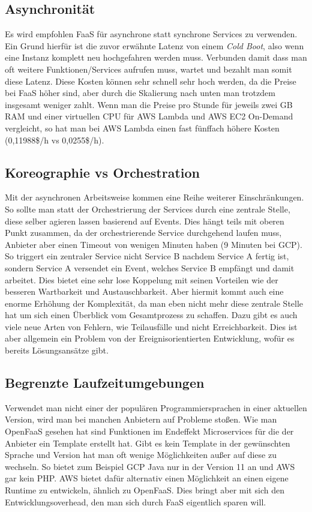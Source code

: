 \documentclass[12pt, a4paper]{article}
\begin{document}
\subsection{Asynchronität}
Es wird empfohlen \ac{FaaS} für asynchrone statt synchrone Services zu verwenden.
Ein Grund hierfür ist die zuvor erwähnte Latenz von einem \emph{Cold Boot}, also wenn eine Instanz komplett neu hochgefahren werden muss.
Verbunden damit dass man oft weitere Funktionen/Services aufrufen muss, wartet und bezahlt man somit diese Latenz.
Diese Kosten können sehr schnell sehr hoch werden, da die Preise bei \ac{FaaS} höher sind, aber durch die Skalierung nach unten man trotzdem insgesamt weniger zahlt.
Wenn man die Preise pro Stunde für jeweils zwei GB RAM und einer virtuellen CPU für AWS Lambda und AWS EC2 On-Demand vergleicht, so hat man bei AWS Lambda einen fast fünffach höhere Kosten (0,11988\$/h vs 0,0255\$/h)\cite{aws_lambda_pricing}\cite{aws_ec2_pricing}\cite{aws_lambda_memory_cpu}.

\subsection{Koreographie vs Orchestration}
Mit der asynchronen Arbeitsweise kommen eine Reihe weiterer Einschränkungen.
So sollte man statt der Orchestrierung der Services durch eine zentrale Stelle, diese selber agieren lassen basierend auf Events.
Dies hängt teils mit oberen Punkt zusammen, da der orchestrierende Service durchgehend laufen muss, Anbieter aber einen Timeout von wenigen Minuten haben (9 Minuten bei \ac{GCP}\cite{gcp_function_timeout}).
So triggert ein zentraler Service nicht Service B nachdem Service A fertig ist, sondern Service A versendet ein Event, welches Service B empfängt und damit arbeitet.
Dies bietet eine sehr lose Koppelung mit seinen Vorteilen wie der besseren Wartbarkeit und Austauschbarkeit.
Aber hiermit kommt auch eine enorme Erhöhung der Komplexität, da man eben nicht mehr diese zentrale Stelle hat um sich einen Überblick vom Gesamtprozess zu schaffen.
Dazu gibt es auch viele neue Arten von Fehlern, wie Teilausfälle und nicht Erreichbarkeit.
Dies ist aber allgemein ein Problem von der Ereignisorientierten Entwicklung, wofür es bereits Lösungsansätze gibt.

\subsection{Begrenzte Laufzeitumgebungen}
Verwendet man nicht einer der populären Programmiersprachen in einer aktuellen Version, wird man bei manchen Anbietern auf Probleme stoßen.
Wie man OpenFaaS gesehen hat sind Funktionen im Endeffekt Microservices für die der Anbieter ein Template erstellt hat.
Gibt es kein Template in der gewünschten Sprache und Version hat man oft wenige Möglichkeiten außer auf diese zu wechseln.
So bietet zum Beispiel \ac{GCP} Java nur in der Version 11 an \cite{gcp_function_runtimes} und \ac{AWS} gar kein PHP\cite{aws_lambda_runtimes}.
\newline
\ac{AWS} bietet dafür alternativ einen Möglichkeit an einen eigene Runtime zu entwickeln, ähnlich zu OpenFaaS.
Dies bringt aber mit sich den Entwicklungsoverhead, den man sich durch \ac{FaaS} eigentlich sparen will.
\end{document}
